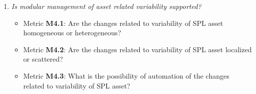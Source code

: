 \begin{enumerate}[Q1]
\item \emph{Is modular management of asset related variability supported?}
\begin{itemize}
\item Metric \textbf{M4.1}: Are the changes related to variability of SPL asset homogeneous or heterogeneous?
\item Metric \textbf{M4.2}: Are the changes related to variability of SPL asset localized or scattered?
\item Metric \textbf{M4.3}: What is the possibility of automation of the changes related to variability of SPL asset?
\end{itemize}
\end{enumerate}


